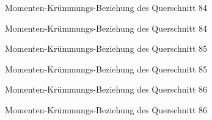 \documentclass[
  11pt,
  letterpaper,
]{scrreprt}
\begin{document}
\begin{figure}[H]


\caption{\label{fig-qs_84}Momenten-Krümmungs-Beziehung des Querschnitt
84}

\end{figure}%

\begin{figure}[H]


\caption{\label{fig-m_chi_84}Momenten-Krümmungs-Beziehung des
Querschnitt 84}

\end{figure}%

\begin{figure}[H]


\caption{\label{fig-qs_85}Momenten-Krümmungs-Beziehung des Querschnitt
85}

\end{figure}%

\begin{figure}[H]


\caption{\label{fig-m_chi_85}Momenten-Krümmungs-Beziehung des
Querschnitt 85}

\end{figure}%

\begin{figure}[H]


\caption{\label{fig-qs_86}Momenten-Krümmungs-Beziehung des Querschnitt
86}

\end{figure}%

\begin{figure}[H]


\caption{\label{fig-m_chi_86}Momenten-Krümmungs-Beziehung des
Querschnitt 86}

\end{figure}%
\end{document}
